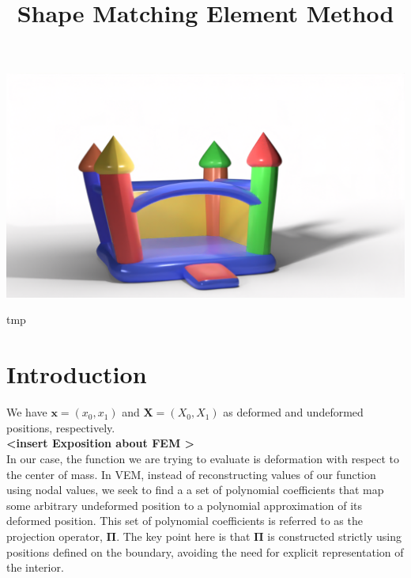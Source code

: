 \documentclass[sigconf]{acmart}
\begin{document}
\title{Shape Matching Element Method}

\begin{teaserfigure}
  \includegraphics[width=\textwidth]{castle.png}
  \caption{tmp}
  \Description{}
  \label{fig:teaser}
\end{teaserfigure}

\maketitle

\section{Introduction}



We have $\mathbf{x} = (x_0, x_1)$ and $\mathbf{X} = (X_0, X_1) $ as deformed and undeformed positions, respectively. \\

\textbf{<insert Exposition about FEM >} \\
In our case, the function we are trying to evaluate is deformation with respect to the center of mass. In VEM, instead of reconstructing values of our function using nodal values, we seek to find a a set of polynomial coefficients that map some arbitrary undeformed position to a polynomial approximation of its deformed position. This set of polynomial coefficients is referred to as the projection operator, $\mathbf{\Pi}$. The key point here is that $\mathbf{\Pi}$ is constructed strictly using positions defined on the boundary, avoiding the need for explicit representation of the interior. \\
\end{document}
